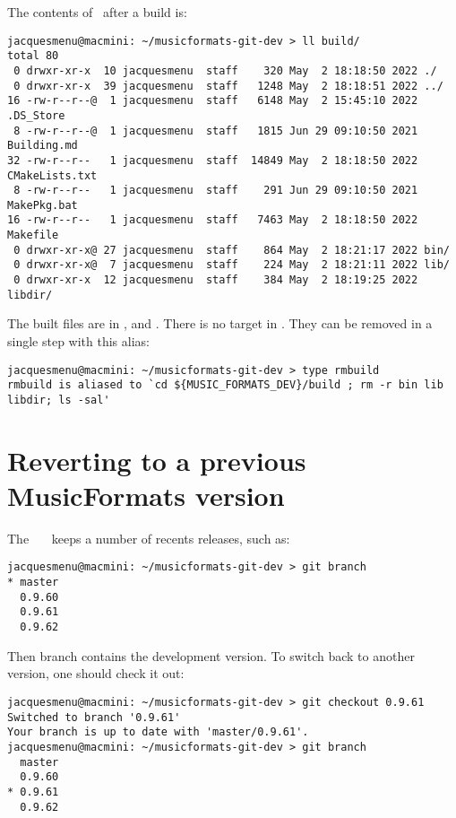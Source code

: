 The contents of \distrib\ after a build is:
\begin{lstlisting}[language=Terminal]
jacquesmenu@macmini: ~/musicformats-git-dev > ll build/
total 80
 0 drwxr-xr-x  10 jacquesmenu  staff    320 May  2 18:18:50 2022 ./
 0 drwxr-xr-x  39 jacquesmenu  staff   1248 May  2 18:18:51 2022 ../
16 -rw-r--r--@  1 jacquesmenu  staff   6148 May  2 15:45:10 2022 .DS_Store
 8 -rw-r--r--@  1 jacquesmenu  staff   1815 Jun 29 09:10:50 2021 Building.md
32 -rw-r--r--   1 jacquesmenu  staff  14849 May  2 18:18:50 2022 CMakeLists.txt
 8 -rw-r--r--   1 jacquesmenu  staff    291 Jun 29 09:10:50 2021 MakePkg.bat
16 -rw-r--r--   1 jacquesmenu  staff   7463 May  2 18:18:50 2022 Makefile
 0 drwxr-xr-x@ 27 jacquesmenu  staff    864 May  2 18:21:17 2022 bin/
 0 drwxr-xr-x@  7 jacquesmenu  staff    224 May  2 18:21:11 2022 lib/
 0 drwxr-xr-x  12 jacquesmenu  staff    384 May  2 18:19:25 2022 libdir/
\end{lstlisting}

The built files are in ,  and . There is no  target in \Makefile. They can be removed in a single step with this alias:
\begin{lstlisting}[language=Terminal]
jacquesmenu@macmini: ~/musicformats-git-dev > type rmbuild
rmbuild is aliased to `cd ${MUSIC_FORMATS_DEV}/build ; rm -r bin lib libdir; ls -sal'
\end{lstlisting}


\section{Reverting to a previous MusicFormats version}

The \github\ \mf\ \repo\ keeps a number of recents releases, such as:
\begin{lstlisting}[language=Terminal]
jacquesmenu@macmini: ~/musicformats-git-dev > git branch
* master
  0.9.60
  0.9.61
  0.9.62
\end{lstlisting}

Then  branch contains the development version. To switch back to another version, one should check it out:
\begin{lstlisting}[language=Terminal]
jacquesmenu@macmini: ~/musicformats-git-dev > git checkout 0.9.61
Switched to branch '0.9.61'
Your branch is up to date with 'master/0.9.61'.
jacquesmenu@macmini: ~/musicformats-git-dev > git branch
  master
  0.9.60
* 0.9.61
  0.9.62
\end{lstlisting}

